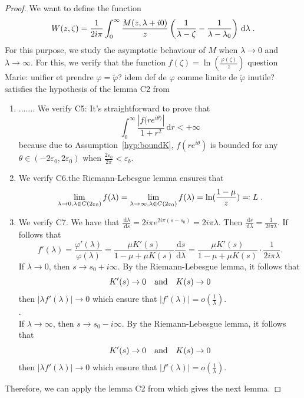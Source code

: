 \documentclass[11pt]{amsart}
\newcommand{\MD}{\color{vert}}
\newcommand{\diff}{\,\mathrm{d}}
\begin{document}
\begin{proof}
We want to define the function
\begin{align}\label{def:W}
    W(z, \zeta) = \frac{1}{2i\pi }\int_0^\infty  \frac{M(z,\lambda+i0)}{z}\left( \frac{1}{\lambda-\zeta} - \frac{1}{\lambda-\lambda_0}\right) \diff \lambda 
    \eqfinp
\end{align}
For this purpose, we study the asymptotic behaviour of $M$ when $\lambda \to 0$ and $\lambda \to \infty$. For this, we verify that the function $f(\zeta) = \ln(\frac{\varphi(\zeta)}{z})$ {\MD question Marie: unifier et prendre $\varphi=\tilde\varphi$? idem def de $\varphi$ comme limite de $\tilde\varphi$ inutile?} satisfies the hypothesis of the lemma C2 from \cite{escobedo2007fundamental}
\begin{enumerate}
\item .......   We verify C5: It's straightforward to prove that 
    $$\int_0^\infty \frac{|f(r e^{i\theta)}|}{1+r^2}\diff r < +\infty$$ because due to Assumption~\ref{hyp:boundK}, $f(re^{i\theta})$ is bounded for any $\theta \in (-2\varepsilon_0, 2\varepsilon_0)$ when $\frac{2\varepsilon_0}{2\pi} < \varepsilon_b$. 
    \item We verify C6.the Riemann-Lebesgue lemma ensures that 
    $$ \lim_{\lambda \to 0, \lambda \in C(2\varepsilon_0)} f(\lambda) = 
     \lim_{\lambda \to \infty, \lambda \in C(2\varepsilon_0)} f(\lambda)=\ln(\frac{1-\mu}{z}) 
 \eqqcolon L\; .$$
    \item We verify C7. We have that $\frac{\diff \lambda}{\diff s} = 2i\pi e^{2i\pi(s-s_0)} = 2i\pi \lambda$. Then 
    $\frac{\diff s}{\diff \lambda} = \frac{1}{2i\pi\lambda}$. 
    If follows that 
    $$f'(\lambda) = \frac{\varphi'(\lambda)}{\varphi(\lambda)} = \frac{\mu K'(s)}{1 - \mu + \mu K(s)}\frac{\diff s}{\diff \lambda} = \frac{\mu K'(s)}{1 - \mu + \mu K(s)} \cdot \frac{1}{2i\pi\lambda}. $$
    If $\lambda \to 0$, then $s \to s_0+i\infty$. By the Riemann-Lebesgue lemma, it follows that $$K'(s) \to 0 \quad \text{and} \quad K(s) \to 0$$ then  $|\lambda f'(\lambda)| \to 0$ which ensure that $|f'(\lambda)| = o(\frac{1}{\lambda})$. \\. \\
    If $\lambda \to \infty$, then $s \to s_0-i\infty$. By the Riemann-Lebesgue lemma, it follows that $$K'(s) \to 0 \quad \text{and} \quad K(s) \to 0$$ then  $|\lambda f'(\lambda)| \to 0$ which ensure that $|f'(\lambda)| = o(\frac{1}{\lambda})$. \\
\end{enumerate}
Therefore, we can apply the lemma C2 from \cite{escobedo2007fundamental} which gives the next lemma. 


\end{proof}
\end{document}
